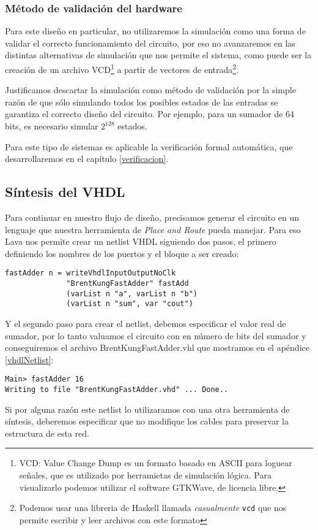 \subsubsection{Método de validación del hardware}
Para este diseño en particular, no utilizaremos la simulación como una forma de validar el correcto funcionamiento del circuito, por eso no avanzaremos en las distintas alternativas de simulación que nos permite el sistema, como puede ser la creación de un archivo VCD\footnote{VCD: Value Change Dump es un formato basado en ASCII para loguear señales, que es utilizado por herramietas de simulación lógica. Para visualizarlo podemos utilizar el software GTKWave, de licencia libre.} a partir de vectores de entrada\footnote{Podemos usar una libreria de Haskell llamada \emph{casualmente} \verb.vcd. que nos permite escribir y leer archivos con este formato}.

Justificamos descartar la simulación como método de validación por la simple razón de que sólo simulando todos los posibles estados de las entradas se garantiza el correcto diseño del circuito. Por ejemplo, para un sumador de 64 bits, es necesario simular $2^{128}$ estados.

Para este tipo de sistemas es aplicable la verificación formal automática, que desarrollaremos en el capítulo \ref{verificacion}.

\subsection{Síntesis del  VHDL}

Para continuar en nuestro flujo de diseño, precisamos generar el circuito en un lenguaje que nuestra herramienta de \emph{Place and Route} pueda manejar. Para eso Lava nos permite crear un netlist VHDL siguiendo dos pasos, el primero definiendo los nombres de los puertos y el bloque a ser creado:
\begin{lstlisting}
fastAdder n = writeVhdlInputOutputNoClk
              "BrentKungFastAdder" fastAdd
              (varList n "a", varList n "b")
              (varList n "sum", var "cout")
\end{lstlisting}

Y el segundo paso para crear el netlist, debemos especificar el valor real de sumador, por lo tanto valuamos el circuito con en número de bits del sumador y conseguiremos el archivo BrentKungFastAdder.vhl que mostramos en el apéndice \ref{vhdlNetlist}:
\begin{lstlisting}
Main> fastAdder 16
Writing to file "BrentKungFastAdder.vhd" ... Done..
\end{lstlisting}

\noindent Si por alguna razón este netlist lo utilizaramos con una otra herramienta de síntesis, deberemos especificar que no modifique los cables para preservar la estructura de esta red.

